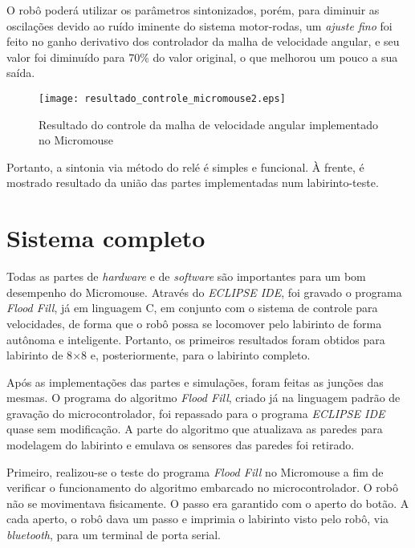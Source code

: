 	O robô poderá utilizar os parâmetros sintonizados, porém, para diminuir as oscilações devido ao ruído iminente do sistema motor-rodas, um \emph{ajuste fino} foi feito no ganho derivativo dos controlador da malha de velocidade angular, e seu valor foi diminuído para 70\% do valor original, o que melhorou um pouco a sua saída.
	
\begin{figure}[!htb]
	\caption{\label{fig:resultado_controle_micromouse2}Resultado do controle da malha de velocidade angular implementado no Micromouse}
	\begin{center}
		\texttt{[image: resultado\_controle\_micromouse2.eps]}
	\end{center}
\end{figure}


	Portanto, a sintonia via método do relé é simples e funcional. À frente, é mostrado resultado da união das partes implementadas num labirinto-teste.

\section{Sistema completo}

Todas as partes de \textit{hardware} e de \textit{software} são importantes para um bom desempenho do Micromouse. Através do \textit{ECLIPSE IDE}, foi gravado o programa \emph{Flood Fill}, já em linguagem C, em conjunto com o sistema de controle para velocidades, de forma que o robô possa se locomover pelo labirinto de forma autônoma e inteligente. Portanto, os primeiros resultados foram obtidos para labirinto de 8$\times$8 e, posteriormente, para o labirinto completo.

Após as implementações das partes e simulações, foram feitas as junções das mesmas. O programa do algoritmo \emph{Flood Fill}, criado já na linguagem padrão de gravação do microcontrolador, foi repassado para o programa \textit{ECLIPSE IDE} quase sem modificação. A parte do algoritmo que atualizava as paredes para modelagem do labirinto e emulava os sensores das paredes foi retirado. 

Primeiro, realizou-se o teste do programa \emph{Flood Fill} no Micromouse a fim de verificar o funcionamento do algoritmo embarcado no microcontrolador. O robô não se movimentava fisicamente. O passo era garantido com o aperto do botão. A cada aperto, o robô dava um passo e imprimia o labirinto visto pelo robô, via \textit{bluetooth}, para um terminal de porta serial. 

